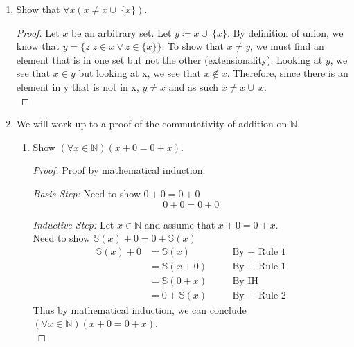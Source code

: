 \documentclass{article}
\newcommand{\union}{\cup\:}
\newcommand{\defeq}{\coloneqq}
\newcommand{\naturals}{\mathbb{N}}
\newcommand{\s}{\mathbb{S}}
\newenvironment{case}[1][Case]
    {\par\textit{#1:}\hfill\break}
    {}
\begin{document}
\begin{enumerate}
    In addition to that, the inductive step falsely assumes that $p_2 \in L$ for every case ($p_2 \notin L$ when k=1). As such, it makes a false claim that $\alpha(p_1) = \alpha(p_2)$.
    \item Show that $\forall x (x \neq x \union \{x\})$.
    \begin{proof}
        Let $x$ be an arbitrary set. Let $y \defeq x \union \{x\}$. By definition of union, we know that $y = \{z|z \in x \lor z \in \{x\}\}$. To show that $x\neq y$, we must find an element that is in one set but not the other (extensionality). Looking at $y$, we see that $x\in y$ but looking at x, we see that $x \notin x$. Therefore, since there is an element in y that is not in x, $y \neq x$ and as such $x \neq x \union x$.\\
    \end{proof}
\pagebreak
  \item We will work up to a proof of the commutativity of addition on $\naturals$.
    \begin{enumerate}
      \item
        Show $(\forall x \in \naturals)(x + 0 = 0 + x)$.
        \begin{proof} Proof by mathematical induction.
        \begin{case}[Basis Step] 
        Need to show $0+0=0+0$
        \begin{equation*}
            0+0=0+0
        \end{equation*}
        \end{case}
        \begin{case}[Inductive Step]
        Let $x \in \naturals$ and assume that $x+0=0+x$.\\
        Need to show $\s(x)+0=0+\s(x)$
        \begin{align*}
          \s(x)+0
            &=\s(x)
            &\quad
            &\text{By $+$ Rule 1}
              \\
            &=\s(x+0)
            &\quad
            &\text{By $+$ Rule 1}
              \\
            &=\s(0+x)
            &\quad
            &\text{By IH}
              \\
            &=0+\s(x)
            &\quad
            &\text{By $+$ Rule 2}
        \end{align*}
        \end{case}
        Thus by mathematical induction, we can conclude $(\forall x \in \naturals)(x + 0 = 0 + x)$.\\  

\end{proof}
\end{enumerate}
\end{enumerate}
\end{document}
